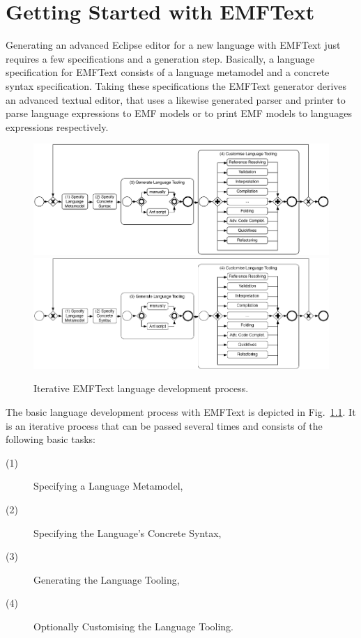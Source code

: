 \chapter{Getting Started with EMFText}

	Generating an advanced Eclipse editor for a new language with EMFText just
	requires a few specifications and a generation step. 
	Basically, a language specification for EMFText consists of a language
	metamodel and a concrete syntax specification. Taking these specifications the
	EMFText generator derives an advanced textual editor, that uses a likewise
	generated parser and printer to parse language expressions to EMF models or to print EMF models to
	languages expressions respectively. 
	
	\begin{figure}[ht]
	\centering
	\ifpdf
		\includegraphics[scale=0.5]{figures/process.pdf}
	\else
		\includegraphics{figures/process.png}
	\fi
	\caption{Iterative EMFText language development process.}
	\label{fig:process}
	\end{figure}
	
	\noindent The basic language development process with EMFText is depicted in
	Fig.~\ref{fig:process}. It is an iterative process that can be passed several
	times and consists of the following basic tasks:
	\begin{description}
	  \item[(1)] Specifying a Language Metamodel,
	  \item[(2)] Specifying the Language's Concrete Syntax,
	  \item[(3)] Generating the Language Tooling,
	  \item[(4)] Optionally Customising the Language Tooling.
	\end{description}
	
